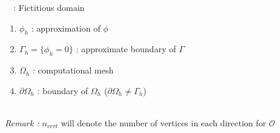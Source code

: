 \begin{frame}{\appendixname~\theappendixframenumber~: Fictitious domain}
	
	\vspace{10pt}
	
	\begin{center}
		\begin{minipage}{0.43\linewidth}
			\centering
		\end{minipage} \hfill
		\begin{minipage}{0.1\linewidth}
			\centering
		\end{minipage} \hfill
		\begin{minipage}{0.43\linewidth}
			\centering
		\end{minipage}
	\end{center}
	
	\begin{enumerate}[\ding{217}]
		\item $\phi_h$ : approximation of $\phi$ \\ 
		\item $\Gamma_h=\{\phi_h=0\}$ : approximate boundary of $\Gamma$
		\item $\Omega_h$ : computational mesh
		\item $\partial\Omega_h$ : boundary of $\Omega_h$ ($\partial\Omega_h \ne \Gamma_h$)
	\end{enumerate}	
	
	\footnotesize
	\; \\
	\textit{Remark :} $n_{vert}$ will denote the number of vertices in each direction for $\mathcal{O}$
\end{frame}


